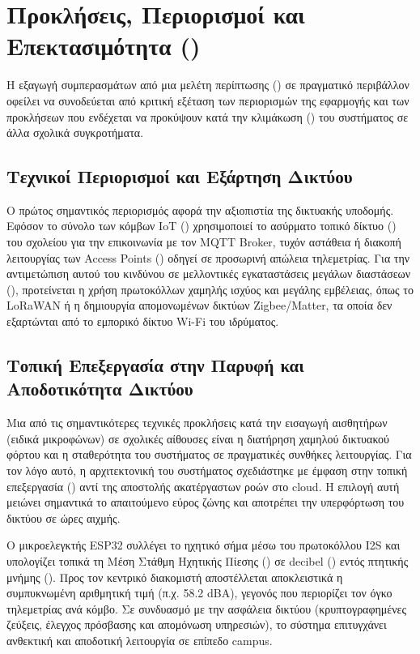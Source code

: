 \section{Προκλήσεις, Περιορισμοί και Επεκτασιμότητα ()}
Η εξαγωγή συμπερασμάτων από μια μελέτη περίπτωσης () σε πραγματικό περιβάλλον οφείλει να συνοδεύεται από κριτική εξέταση των περιορισμών της εφαρμογής και των προκλήσεων που ενδέχεται να προκύψουν κατά την κλιμάκωση () του συστήματος σε άλλα σχολικά συγκροτήματα.

\subsection{Τεχνικοί Περιορισμοί και Εξάρτηση Δικτύου}
Ο πρώτος σημαντικός περιορισμός αφορά την αξιοπιστία της δικτυακής υποδομής. Εφόσον το σύνολο των κόμβων IoT () χρησιμοποιεί το ασύρματο τοπικό δίκτυο () του σχολείου για την επικοινωνία με τον MQTT Broker, τυχόν αστάθεια ή διακοπή λειτουργίας των Access Points () οδηγεί σε προσωρινή απώλεια τηλεμετρίας. Για την αντιμετώπιση αυτού του κινδύνου σε μελλοντικές εγκαταστάσεις μεγάλων διαστάσεων (), προτείνεται η χρήση πρωτοκόλλων χαμηλής ισχύος και μεγάλης εμβέλειας, όπως το LoRaWAN ή η δημιουργία απομονωμένων δικτύων Zigbee/Matter, τα οποία δεν εξαρτώνται από το εμπορικό δίκτυο Wi-Fi του ιδρύματος.

\subsection{Τοπική Επεξεργασία στην Παρυφή και Αποδοτικότητα Δικτύου}
Μια από τις σημαντικότερες τεχνικές προκλήσεις κατά την εισαγωγή αισθητήρων (ειδικά μικροφώνων) σε σχολικές αίθουσες είναι η διατήρηση χαμηλού δικτυακού φόρτου και η σταθερότητα του συστήματος σε πραγματικές συνθήκες λειτουργίας. Για τον λόγο αυτό, η αρχιτεκτονική του συστήματος σχεδιάστηκε με έμφαση στην τοπική επεξεργασία () αντί της αποστολής ακατέργαστων ροών στο cloud. Η επιλογή αυτή μειώνει σημαντικά το απαιτούμενο εύρος ζώνης και αποτρέπει την υπερφόρτωση του δικτύου σε ώρες αιχμής.

Ο μικροελεγκτής ESP32 συλλέγει το ηχητικό σήμα μέσω του πρωτοκόλλου I2S και υπολογίζει τοπικά τη Μέση Στάθμη Ηχητικής Πίεσης () σε decibel () εντός πτητικής μνήμης (). Προς τον κεντρικό διακομιστή αποστέλλεται αποκλειστικά η συμπυκνωμένη αριθμητική τιμή (π.χ. 58.2 dBA), γεγονός που περιορίζει τον όγκο τηλεμετρίας ανά κόμβο. Σε συνδυασμό με την ασφάλεια δικτύου (κρυπτογραφημένες ζεύξεις, έλεγχος πρόσβασης και απομόνωση υπηρεσιών), το σύστημα επιτυγχάνει ανθεκτική και αποδοτική λειτουργία σε επίπεδο campus.

